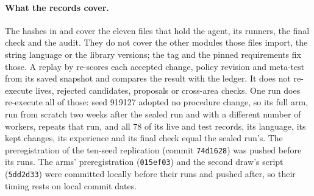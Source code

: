 \documentclass[11pt]{article}
\begin{document}
\paragraph{What the records cover.} The hashes in  and  cover the eleven files that hold the agent, its runners, the final check and the audit. They do not cover the other modules those files import, the string language or the library versions; the tag and the pinned requirements fix those. A replay by  re-scores each accepted change, policy revision and meta-test from its saved snapshot and compares the result with the ledger. It does not re-execute lives, rejected candidates, proposals or cross-area checks. One run does re-execute all of those: seed 919127 adopted no procedure change, so its full arm, run from scratch two weeks after the sealed run and with a different number of workers, repeats that run, and all 78 of its live and test records, its language, its kept changes, its experience and its final check equal the sealed run's. The preregistration of the ten-seed replication (commit \texttt{74d1628}) was pushed before its runs. The arms' preregistration (\texttt{015ef03}) and the second draw's script (\texttt{5dd2d33}) were committed locally before their runs and pushed after, so their timing rests on local commit dates.
\end{document}
